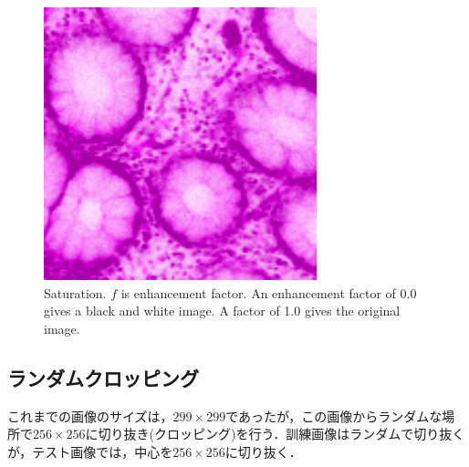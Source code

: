 \begin{figure}[H]
\begin{minipage}{0.25\columnwidth}
	\end{minipage}
	\begin{minipage}{0.25\columnwidth}
		\centering
		\includegraphics[clip, width=\linewidth]{fig/preprocessing/data_aug/color/SATURATION/SATURATION_1_50}
	\end{minipage}	
	
	\caption{Saturation. $f$ is enhancement factor. An enhancement factor of 0.0 gives a black and white image. A factor of 1.0 gives the original image.}
	\label{fig:彩度}
	
\end{figure}

\subsection*{ランダムクロッピング}
これまでの画像のサイズは，$299 \times 299$であったが，この画像からランダムな場所で$256 \times 256$に切り抜き(クロッピング)を行う．訓練画像はランダムで切り抜くが，テスト画像では，中心を$256 \times 256$に切り抜く．

